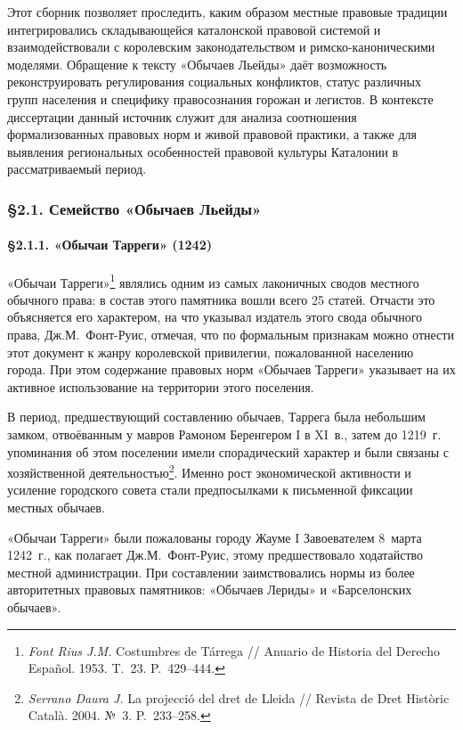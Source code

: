Этот сборник позволяет проследить, каким образом местные правовые традиции интегрировались складывающейся каталонской правовой системой и взаимодействовали с королевским законодательством и римско-каноническими моделями. Обращение к тексту «Обычаев Льейды» даёт возможность реконструировать регулирования социальных конфликтов, статус различных групп населения и специфику правосознания горожан и легистов. В контексте диссертации данный источник служит для анализа соотношения формализованных правовых норм и живой правовой практики, а также для выявления региональных особенностей правовой культуры Каталонии в рассматриваемый период.

\subsubsection*{§2.1. Семейство «Обычаев Льейды»}

\paragraph*{§2.1.1. «Обычаи Тарреги» (1242)}

«Обычаи Тарреги»\footnote{\emph{Font Rius J.M. }Costumbres de Tárrega // Anuario de Historia del Derecho Español. 1953. T.~23. P.~429--444.} являлись одним из самых лаконичных сводов местного обычного права: в состав этого памятника вошли всего 25 статей. Отчасти это объясняется его характером, на что указывал издатель этого свода обычного права, Дж.М.~Фонт-Руис, отмечая, что по формальным признакам можно отнести этот документ к жанру королевской привилегии, пожалованной населению города. При этом содержание правовых норм «Обычаев Тарреги» указывает на их активное использование на территории этого поселения.

В период, предшествующий составлению обычаев, Таррега была небольшим замком, отвоёванным у мавров Рамоном Беренгером I в XI~в., затем до 1219~г. упоминания об этом поселении имели спорадический характер и были связаны с хозяйственной деятельностью\footnote{\emph{Serrano Daura J.} La projecció del dret de Lleida // Revista de Dret Històric Català. 2004. №~3. P.~233--258.}. Именно рост экономической активности и усиление городского совета стали предпосылками к письменной фиксации местных обычаев.

«Обычаи Тарреги» были пожалованы городу Жауме I Завоевателем 8~марта 1242~г., как полагает Дж.М.~Фонт-Руис, этому предшествовало ходатайство местной администрации. При составлении заимствовались нормы из более авторитетных правовых памятников: «Обычаев Лериды» и «Барселонских обычаев».

